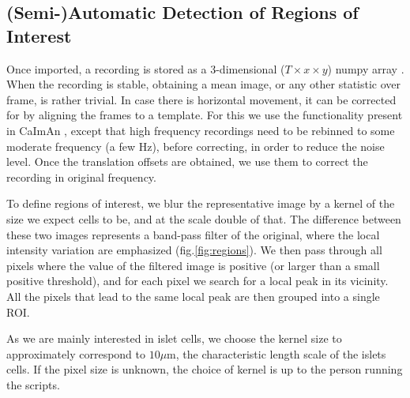 \documentclass[a4paper,11pt,oneside,]{article}
\begin{document}
\subsection{(Semi-)Automatic Detection of Regions of Interest}

Once imported, a recording is stored as a 3-dimensional ($T{\times}x{\times}y$) numpy array \cite{2020NumPy-Array}.
When the recording is stable, obtaining a mean image, or any other statistic over frame, is rather trivial. 
In case there is horizontal movement, it can be corrected for by aligning the frames to a template. 
For this we use the functionality present in CaImAn \cite{giovannucci2019caiman}, except that high frequency recordings need to be rebinned to some moderate frequency (a few Hz), before correcting, in order to reduce the noise level. 
Once the translation offsets are obtained, we use them to correct the recording in original frequency.

To define regions of interest, we blur the representative image by a kernel of the size we expect cells to be, and at the scale double of that.
The difference between these two images represents a band-pass filter of the original, where the local intensity variation are emphasized (fig.\ref{fig:regions}).
We then pass through all pixels where the value of the filtered image is positive (or larger than a small positive threshold), and for each pixel we search for a local peak in its vicinity. 
All the pixels that lead to the same local peak are then grouped into a single ROI.

As we are mainly interested in islet cells, we choose the kernel size to approximately correspond to $10\mu$m, the characteristic length scale of the islets cells.
If the pixel size is unknown, the choice of kernel is up to the person running the scripts.
\end{document}
